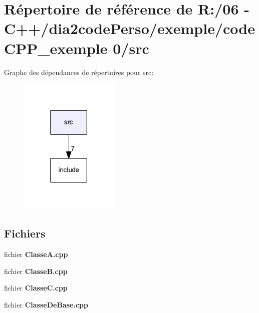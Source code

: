 \section{Répertoire de référence de R\+:/06 -\/ C++/dia2code\+Perso/exemple/code\+C\+P\+P\+\_\+exemple 0/src}
\label{dir_68267d1309a1af8e8297ef4c3efbcdba}
Graphe des dépendances de répertoires pour src\+:\nopagebreak
\begin{figure}[H]
\begin{center}
\leavevmode
\includegraphics[width=134pt]{dir_68267d1309a1af8e8297ef4c3efbcdba_dep}
\end{center}
\end{figure}
\subsection*{Fichiers}
\begin{DoxyCompactItemize}
\item 
fichier {\bf Classe\+A.\+cpp}
\item 
fichier {\bf Classe\+B.\+cpp}
\item 
fichier {\bf Classe\+C.\+cpp}
\item 
fichier {\bf Classe\+De\+Base.\+cpp}
\end{DoxyCompactItemize}
